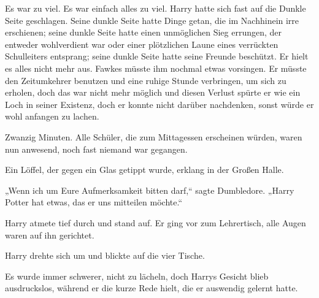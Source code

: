 Es war zu viel. Es war einfach alles zu viel. Harry hatte sich fast auf die Dunkle Seite geschlagen. Seine dunkle Seite hatte Dinge getan, die im Nachhinein irre erschienen; seine dunkle Seite hatte einen unmöglichen Sieg errungen, der entweder wohlverdient war oder einer plötzlichen Laune eines verrückten Schulleiters entsprang; seine dunkle Seite hatte seine Freunde beschützt. Er hielt es alles nicht mehr aus. Fawkes müsste ihm nochmal etwas vorsingen. Er müsste den Zeitumkehrer benutzen und eine ruhige Stunde verbringen, um sich zu erholen, doch das war nicht mehr möglich und diesen Verlust spürte er wie ein Loch in seiner Existenz, doch er konnte nicht darüber nachdenken, sonst würde er wohl anfangen zu lachen.

Zwanzig Minuten. Alle Schüler, die zum Mittagessen erscheinen würden, waren nun anwesend, noch fast niemand war gegangen.

Ein Löffel, der gegen ein Glas getippt wurde, erklang in der Großen Halle.

„Wenn ich um Eure Aufmerksamkeit bitten darf,“ sagte Dumbledore. „Harry Potter hat etwas, das er uns mitteilen möchte.“

Harry atmete tief durch und stand auf. Er ging vor zum Lehrertisch, alle Augen waren auf ihn gerichtet.

Harry drehte sich um und blickte auf die vier Tische.

Es wurde immer schwerer, nicht zu lächeln, doch Harrys Gesicht blieb ausdruckslos, während er die kurze Rede hielt, die er auswendig gelernt hatte.

